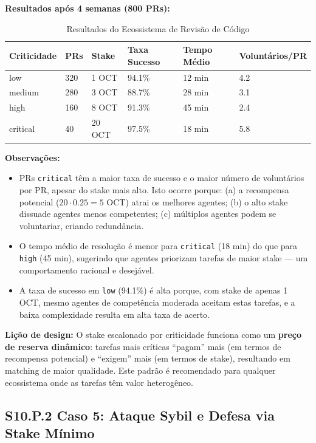 \textbf{Resultados após 4 semanas (800 PRs):}

\begin{table}[htbp]
\centering
\caption{Resultados do Ecossistema de Revisão de Código}
\label{tab:code_review}
\begin{tabular}{p{2cm}p{1.5cm}p{1.5cm}p{1.5cm}p{1.8cm}p{2.5cm}}
\hline
\textbf{Criticidade} & \textbf{PRs} & \textbf{Stake} & \textbf{Taxa Sucesso} & \textbf{Tempo Médio} & \textbf{Voluntários/PR} \\
\hline
low & 320 & 1 OCT & 94.1\% & 12 min & 4.2 \\
medium & 280 & 3 OCT & 88.7\% & 28 min & 3.1 \\
high & 160 & 8 OCT & 91.3\% & 45 min & 2.4 \\
critical & 40 & 20 OCT & 97.5\% & 18 min & 5.8 \\
\hline
\end{tabular}
\end{table}

\textbf{Observações:}
\begin{itemize}
    \item PRs \texttt{critical} têm a maior taxa de sucesso e o maior número de voluntários por PR, apesar do stake mais alto. Isto ocorre porque: (a) a recompensa potencial ($20 \cdot 0.25 = 5$ OCT) atrai os melhores agentes; (b) o alto stake dissuade agentes menos competentes; (c) múltiplos agentes podem se voluntariar, criando redundância.
    \item O tempo médio de resolução é menor para \texttt{critical} (18 min) do que para \texttt{high} (45 min), sugerindo que agentes priorizam tarefas de maior stake --- um comportamento racional e desejável.
    \item A taxa de sucesso em \texttt{low} (94.1\%) é alta porque, com stake de apenas 1 OCT, mesmo agentes de competência moderada aceitam estas tarefas, e a baixa complexidade resulta em alta taxa de acerto.
\end{itemize}

\textbf{Lição de design:} O stake escalonado por criticidade funciona como um \textbf{preço de reserva dinâmico}: tarefas mais críticas ``pagam'' mais (em termos de recompensa potencial) e ``exigem'' mais (em termos de stake), resultando em matching de maior qualidade. Este padrão é recomendado para qualquer ecossistema onde as tarefas têm valor heterogêneo.

\subsection*{S10.P.2 Caso 5: Ataque Sybil e Defesa via Stake Mínimo}

